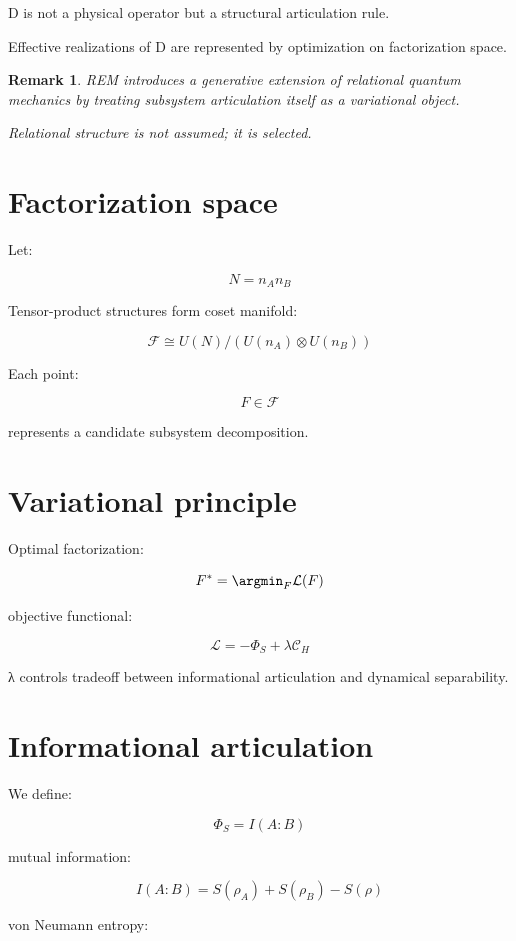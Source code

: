 \documentclass[11pt]{article}
\newtheorem{remark}{Remark}
\begin{document}
D is not a physical operator but a structural articulation rule.

Effective realizations of D are represented by optimization on factorization space.

\begin{remark}

REM introduces a generative extension of relational quantum mechanics
by treating subsystem articulation itself as a variational object.

Relational structure is not assumed; it is selected.

\end{remark}

\section{Factorization space}

Let:

\[
N=n_A n_B
\]

Tensor-product structures form coset manifold:

\[
\mathcal F
\cong
U(N)/(U(n_A)\otimes U(n_B))
\]

Each point:

\[
F \in \mathcal F
\]

represents a candidate subsystem decomposition.

\section{Variational principle}

Optimal factorization:

\[
F^*=\argmin_F \mathcal L(F)
\]

objective functional:

\[
\mathcal L
=
-\Phi_S
+
\lambda \mathcal C_H
\]

λ controls tradeoff between informational articulation
and dynamical separability.

\section{Informational articulation}

We define:

\[
\Phi_S=I(A:B)
\]

mutual information:

\[
I(A:B)
=
S(\rho_A)+S(\rho_B)-S(\rho)
\]

von Neumann entropy:
\end{document}
